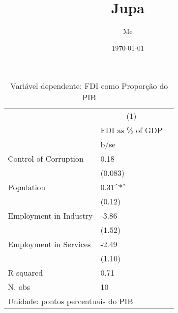 \documentclass{article}
\title{Jupa}
\date{\today}
\author{Me}
\begin{document}
\begin{table}[htbp]\centering
\def\sym#1{\ifmmode^{#1}\else\(^{#1}\)\fi}
\caption{Variável dependente: FDI como Proporção do PIB \label{tab1}}
\begin{tabular}{l*{1}{l c}}
\hline\hline
                    &\multicolumn{1}{c}{(1)}\\
                    &\multicolumn{1}{c}{FDI as \% of GDP}\\
                    &        b/se         \\
\hline
Control of Corruption&        0.18         \\
                    &     (0.083)         \\
Population          &        0.31\sym{*}  \\
                    &      (0.12)         \\
Employment in Industry&       -3.86         \\
                    &      (1.52)         \\
Employment in Services&       -2.49         \\
                    &      (1.10)         \\
\hline
R-squared           &        0.71         \\
N. obs              &          10         \\
\hline\hline
\multicolumn{2}{l}{\footnotesize Unidade: pontos percentuais do PIB}\\
\end{tabular}
\end{table}
\end{document}
